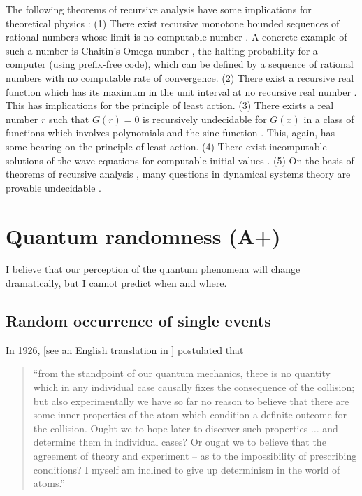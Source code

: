 \documentclass[%
 reprint,
 showpacs,
 showkeys,
 preprintnumbers,
 amsmath,amssymb,
 aps,
 prl,
  longbibliography,
 ]{revtex4-1}
\begin{document}
The following theorems of recursive  analysis \citep{aberth-80,Weihrauch} have some
implications for theoretical physics \citep{kreisel}:
(1)
There exist recursive monotone bounded sequences of rational numbers
whose limit is no computable number
\citep{Specker49}.
A concrete example of such a number is Chaitin's Omega number \citep{chaitin3,calude:02,calude-dinneen06},
the halting probability for a computer (using prefix-free code),
which can be defined by a sequence of rational numbers
with no computable rate of convergence.
(2)
There exist a recursive real function which has its maximum in the unit interval
at no recursive real number \citep{Specker57}.
This has implications for the principle of least action.
(3)
There exists a real number $r$ such that $G(r) = 0$ is recursively undecidable for $G(x)$
in a class of functions which involves polynomials and the sine function
\citep{wang}.
This, again, has some bearing on  the principle of least action.
(4)
There exist incomputable solutions of the wave equations for computable initial values
\citep{pr1,bridges1}.
(5)
On the basis of theorems of recursive analysis \citep{Scarpellini-63,richardson68},
many questions in dynamical systems theory are provable undecidable \citep{1985cfd..book.....F,dc-d93,Stewart-91,calude:037103}.


\section{Quantum randomness (A+)}

I believe that our perception of the quantum phenomena will change dramatically, but I cannot predict when and where.

\subsection{Random occurrence of single events}

In 1926, \citet[866]{born-26-1} [see an English translation in \citet[54]{wheeler-Zurek:83}] postulated that
\begin{quote}
{``from the standpoint of our quantum mechanics, there is no quantity
which in any individual case causally fixes the consequence of the collision;
but also experimentally we have so far no reason to believe that there are some inner properties of the atom
which condition a definite outcome for the collision.
Ought we to hope later to discover such properties $\ldots$  and determine them in individual cases?
Or ought we to  believe that the agreement of theory and experiment  --  as to the impossibility
of prescribing conditions? I myself am inclined  to give up determinism in the world of atoms.''
}
\end{quote}
\end{document}
